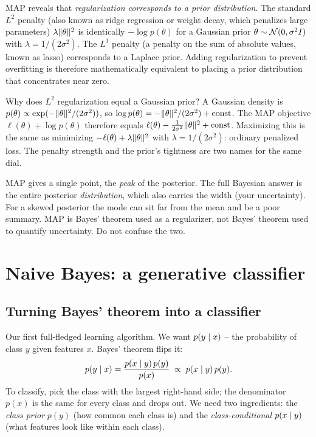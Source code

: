 \begin{aestheticbox}
MAP reveals that \emph{regularization corresponds to a prior distribution}. The standard
$L^2$ penalty (also known as ridge regression or weight decay, which penalizes large parameters) $\lambda\lVert\theta\rVert^2$ is
identically $-\log p(\theta)$ for a Gaussian prior
$\theta\sim\mathcal{N}(0,\sigma^2 I)$ with $\lambda = 1/(2\sigma^2)$. The $L^1$ penalty (a penalty on the sum of absolute values, known as lasso) corresponds to a Laplace prior. Adding regularization to
prevent overfitting is therefore mathematically equivalent to placing a
prior distribution that concentrates near zero.
\end{aestheticbox}

\begin{whybox}
Why does $L^2$ regularization equal a Gaussian prior? A Gaussian density is
$p(\theta)\propto \exp(-\lVert\theta\rVert^2/(2\sigma^2))$, so
$\log p(\theta) = -\lVert\theta\rVert^2/(2\sigma^2) + \text{const}$. The MAP objective
$\ell(\theta) + \log p(\theta)$ therefore equals
$\ell(\theta) - \tfrac{1}{2\sigma^2}\lVert\theta\rVert^2 + \text{const}$. Maximizing
this is the same as minimizing $-\ell(\theta) + \lambda\lVert\theta\rVert^2$ with
$\lambda=1/(2\sigma^2)$: ordinary penalized loss. The penalty strength and the
prior's tightness are two names for the same dial.
\end{whybox}

\begin{trapbox}
MAP gives a single point, the \emph{peak} of the posterior. The full Bayesian
answer is the entire posterior \emph{distribution}, which also carries the width
(your uncertainty). For a skewed posterior the mode can sit far from the mean and
be a poor summary. MAP is Bayes' theorem used as a regularizer, not Bayes' theorem
used to quantify uncertainty. Do not confuse the two.
\end{trapbox}

\section{Naive Bayes: a generative classifier}
\label{ch34:naive-bayes}

\subsection{Turning Bayes' theorem into a classifier}

Our first full-fledged learning algorithm. We want $p(y\mid x)$ -- the
probability of class $y$ given features $x$. Bayes' theorem flips it:
\[
  p(y\mid x) = \frac{p(x\mid y)\,p(y)}{p(x)} \;\propto\; p(x\mid y)\,p(y).
\]
To classify, pick the class with the largest right-hand side; the denominator
$p(x)$ is the same for every class and drops out. We need two ingredients: the
\emph{class prior} $p(y)$ (how common each class is) and the \emph{class-conditional}
$p(x\mid y)$ (what features look like within each class).

